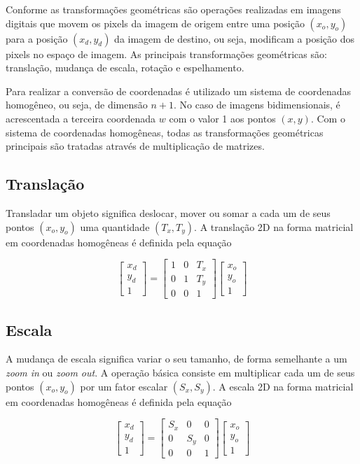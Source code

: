 \documentclass[12pt,oneside,a4paper,english,french,spanish,brazil,]{abntex2}
\begin{document}
Conforme \citet{conci:2003} as transformações geométricas são operações realizadas em imagens digitais que movem os pixels da imagem de origem entre uma posição \((x_o,y_o)\) para a posição \((x_d,y_d)\) da imagem de destino, ou seja, modificam a posição dos pixels no espaço de imagem. As principais transformações geométricas são: translação, mudança de escala, rotação e espelhamento.

Para realizar a conversão de coordenadas é utilizado um sistema de coordenadas homogêneo, ou seja, de dimensão \(n+1\). No caso de imagens bidimensionais, é acrescentada a terceira coordenada \(w\) com o valor 1 aos pontos \((x, y)\). Com o sistema de coordenadas homogêneas, todas as transformações geométricas principais são tratadas através de multiplicação de matrizes.

\subsection{Translação}

Transladar um objeto significa deslocar, mover ou somar a cada um de seus pontos \((x_o,y_o)\) uma quantidade \((T_x,T_y)\). A translação 2D na forma matricial em coordenadas homogêneas é definida pela equação

\[
\begin{bmatrix}
x_d\\ 
y_d\\ 
1
\end{bmatrix}
=
\begin{bmatrix}
1 & 0 & T_x\\ 
0 & 1 & T_y\\ 
0 & 0 & 1
\end{bmatrix}
\begin{bmatrix}
x_o\\ 
y_o\\ 
1
\end{bmatrix}
\]

\subsection{Escala}

A mudança de escala significa variar o seu tamanho, de forma semelhante a um \textit{zoom in} ou \textit{zoom out}. A operação básica consiste em multiplicar cada um de seus pontos \((x_o,y_o)\) por um fator escalar \((S_x,S_y)\). A escala 2D na forma matricial em coordenadas homogêneas é definida pela equação

\[
\begin{bmatrix}
x_d\\ 
y_d\\ 
1
\end{bmatrix}
=
\begin{bmatrix}
S_x & 0 & 0\\ 
0 & S_y & 0\\ 
0 & 0 & 1
\end{bmatrix}
\begin{bmatrix}
x_o\\ 
y_o\\ 
1
\end{bmatrix}
\]
\end{document}
